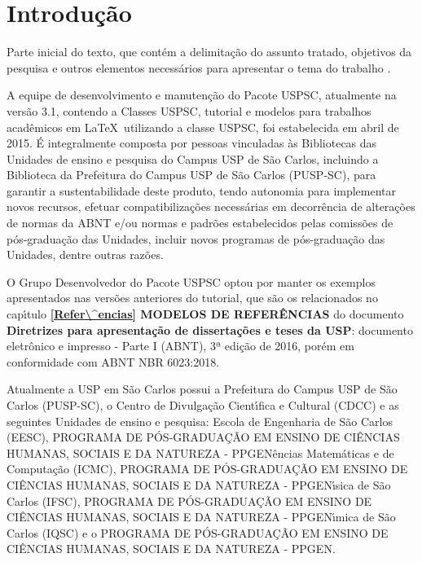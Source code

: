 
\chapter[Introdu\c{c}\~ao]{Introdu\c{c}\~ao}
\label{Introdu\c{c}\~ao}

Parte inicial do texto, que cont\'em a delimita\c{c}\~ao do assunto tratado, objetivos da pesquisa e outros elementos necess\'arios para apresentar o tema do trabalho \cite{aguia2020}.

A equipe de desenvolvimento e manuten\c{c}\~ao do Pacote USPSC, atualmente na vers\~ao 3.1, contendo a Classes USPSC, tutorial e modelos para trabalhos acad\^emicos em \LaTeX\ utilizando a classe USPSC, foi estabelecida em abril de 2015. \'E integralmente composta por pessoas vinculadas \`as Bibliotecas das Unidades de ensino e pesquisa do Campus USP de S\~ao Carlos, incluindo a Biblioteca da Prefeitura do Campus USP de S\~ao Carlos (PUSP-SC), para garantir a sustentabilidade deste produto, tendo autonomia para implementar novos recursos, efetuar compatibiliza\c{c}\~oes necess\'arias em decorr\^encia de altera\c{c}\~oes de normas da ABNT e/ou normas e padr\~oes estabelecidos pelas comiss\~oes de p\'os-gradua\c{c}\~ao das Unidades, incluir novos programas de p\'os-gradua\c{c}\~ao das Unidades, dentre outras raz\~oes.

O Grupo Desenvolvedor do Pacote USPSC optou por manter os exemplos apresentados nas vers\~oes anteriores do tutorial, que s\~ao os relacionados no cap\'{\i}tulo \textbf{\ref{Refer\^encias} MODELOS DE REFER\^ENCIAS} do documento \textbf{Diretrizes para apresenta\c{c}\~ao de disserta\c{c}\~oes e teses da USP}: documento eletr\^onico e impresso - Parte I (ABNT), 3ª edi\c{c}\~ao de 2016, por\'em em conformidade com ABNT NBR 6023:2018. 

Atualmente a USP em S\~ao Carlos possui a Prefeitura do Campus USP de S\~ao Carlos (PUSP-SC), o Centro de Divulga\c{c}\~ao Cient\'{\i}fica e Cultural (CDCC) e as seguintes Unidades de ensino e pesquisa: Escola de Engenharia de S\~ao Carlos (EESC), PROGRAMA DE P\'OS-GRADUA\c{C}\~AO EM ENSINO DE CI\^ENCIAS HUMANAS, SOCIAIS E DA NATUREZA - PPGEN\^encias Matem\'aticas e de Computa\c{c}\~ao (ICMC), PROGRAMA DE P\'OS-GRADUA\c{C}\~AO EM ENSINO DE CI\^ENCIAS HUMANAS, SOCIAIS E DA NATUREZA - PPGEN\'{\i}sica de S\~ao Carlos (IFSC), PROGRAMA DE P\'OS-GRADUA\c{C}\~AO EM ENSINO DE CI\^ENCIAS HUMANAS, SOCIAIS E DA NATUREZA - PPGEN\'{\i}mica de S\~ao Carlos (IQSC) e o PROGRAMA DE P\'OS-GRADUA\c{C}\~AO EM ENSINO DE CI\^ENCIAS HUMANAS, SOCIAIS E DA NATUREZA - PPGEN.

